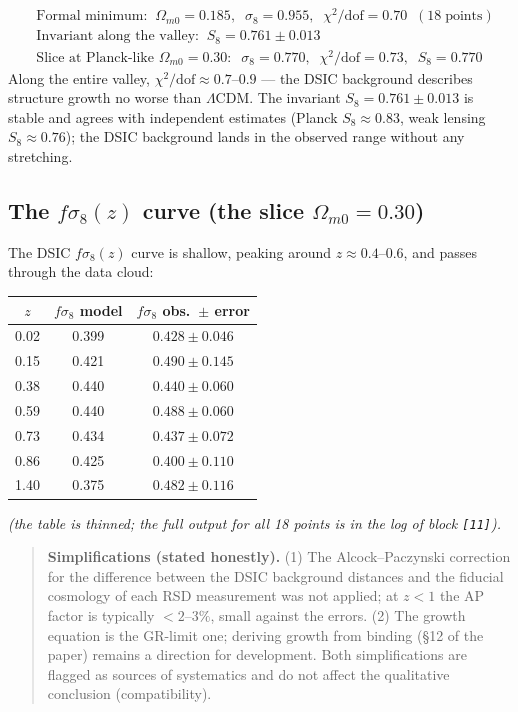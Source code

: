 \documentclass[a4paper,10pt]{article}
\begin{document}
\begin{align*}
&\text{Formal minimum:}\;\; \Omega_{m0} = 0.185,\;\; \sigma_8 = 0.955,\;\; \chi^2/\text{dof} = 0.70 \;\;(18\;\text{points}) \\
&\text{Invariant along the valley:}\;\; S_8 = 0.761 \pm 0.013 \\
&\text{Slice at Planck-like } \Omega_{m0} = 0.30:\;\; \sigma_8 = 0.770,\;\; \chi^2/\text{dof} = 0.73,\;\; S_8 = 0.770
\end{align*}
Along the entire valley, $\chi^2/\text{dof} \approx 0.7\text{--}0.9$ --- the DSIC background describes structure growth no worse than $\Lambda$CDM. The invariant $S_8 = 0.761 \pm 0.013$ is stable and agrees with independent estimates (Planck $S_8 \approx 0.83$, weak lensing $S_8 \approx 0.76$); the DSIC background lands in the observed range without any stretching.

\subsection{The $f\sigma_8(z)$ curve (the slice $\Omega_{m0} = 0.30$)}

The DSIC $f\sigma_8(z)$ curve is shallow, peaking around $z \approx 0.4\text{--}0.6$, and passes through the data cloud:

\begin{table}[htbp]
\centering
\small
\begin{tabular}{@{}ccc@{}}
\toprule
$z$ & $f\sigma_8$ model & $f\sigma_8$ obs.\ $\pm$ error \\
\midrule
0.02 & 0.399 & $0.428 \pm 0.046$ \\
0.15 & 0.421 & $0.490 \pm 0.145$ \\
0.38 & 0.440 & $0.440 \pm 0.060$ \\
0.59 & 0.440 & $0.488 \pm 0.060$ \\
0.73 & 0.434 & $0.437 \pm 0.072$ \\
0.86 & 0.425 & $0.400 \pm 0.110$ \\
1.40 & 0.375 & $0.482 \pm 0.116$ \\
\bottomrule
\end{tabular}
\end{table}

\noindent\textit{(the table is thinned; the full output for all 18 points is in the log of block \texttt{[11]}).}

\begin{quote}
\textbf{Simplifications (stated honestly).} (1) The Alcock--Paczynski correction for the difference between the DSIC background distances and the fiducial cosmology of each RSD measurement was not applied; at $z < 1$ the AP factor is typically $< 2\text{--}3\%$, small against the errors. (2) The growth equation is the GR-limit one; deriving growth from binding (\S12 of the paper) remains a direction for development. Both simplifications are flagged as sources of systematics and do not affect the qualitative conclusion (compatibility).
\end{quote}
\end{document}
